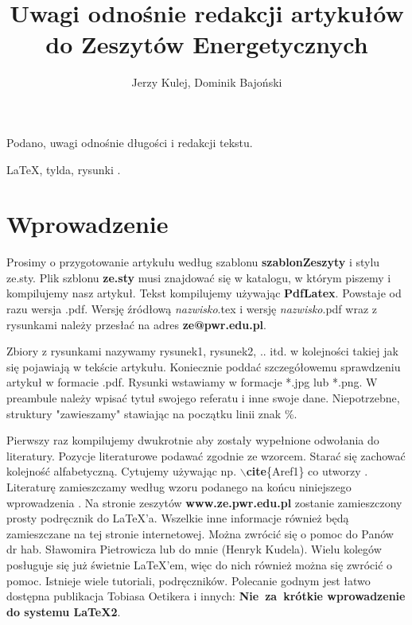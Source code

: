 \documentclass[polish,twoside]{article}
\title{Uwagi odnośnie redakcji artykułów do Zeszytów Energetycznych}
\author{Jerzy Kulej\affmark[1], Dominik Bajoński\affmark[2]}
\begin{document}
\maketitle

\begin{ZEabstract}
Podano, uwagi odnośnie  długości i redakcji tekstu.
\end{ZEabstract}

\begin{keywords}
\LaTeX, tylda, rysunki .
\end{keywords}

\normalsize

\section{Wprowadzenie}

Prosimy o przygotowanie artykułu według szablonu \textbf{szablonZeszyty} i stylu ze.sty.
Plik szblonu \textbf{ ze.sty} musi znajdować się w katalogu, w którym piszemy i  kompilujemy nasz artykuł. Tekst kompilujemy używając\textbf{ PdfLatex}. Powstaje od razu wersja .pdf. Wersję źródłową \emph{nazwisko}.tex i wersję \emph{nazwisko}.pdf wraz z rysunkami należy przesłać na adres \textbf{ze@pwr.edu.pl}.

Zbiory z rysunkami nazywamy rysunek1, rysunek2, .. itd. w kolejności takiej jak się pojawiają w tekście artykułu. Koniecznie poddać szczegółowemu sprawdzeniu artykuł w formacie .pdf. Rysunki wstawiamy w formacje *.jpg lub *.png.  W preambule należy wpisać tytuł swojego referatu i inne swoje dane.
Niepotrzebne, struktury "zawieszamy" stawiając na początku linii znak \%. 

Pierwszy raz kompilujemy dwukrotnie aby zostały wypełnione odwołania do literatury. Pozycje literaturowe  podawać zgodnie ze wzorcem. Starać się zachować kolejność alfabetyczną. Cytujemy używając np. \textbf{$\backslash$cite}\{Aref1\}  co utworzy \cite{Aref1}. Literaturę zamieszczamy według wzoru podanego na końcu niniejszego wprowadzenia . Na stronie zeszytów \textbf{www.ze.pwr.edu.pl} zostanie zamieszczony  prosty podręcznik do \LaTeX'a. Wszelkie inne informacje również będą zamieszczane na tej stronie internetowej. Można zwrócić się o pomoc do Panów dr hab. Sławomira Pietrowicza   lub do mnie (Henryk Kudela). Wielu kolegów posługuje się już świetnie \LaTeX'em, więc do nich również można się zwrócić o pomoc. Istnieje wiele tutoriali, podręczników. Polecanie godnym jest łatwo dostępna  publikacja Tobiasa Oetikera i innych: \textbf{Nie~za~krótkie wprowadzenie do systemu \LaTeX 2}.
\end{document}
